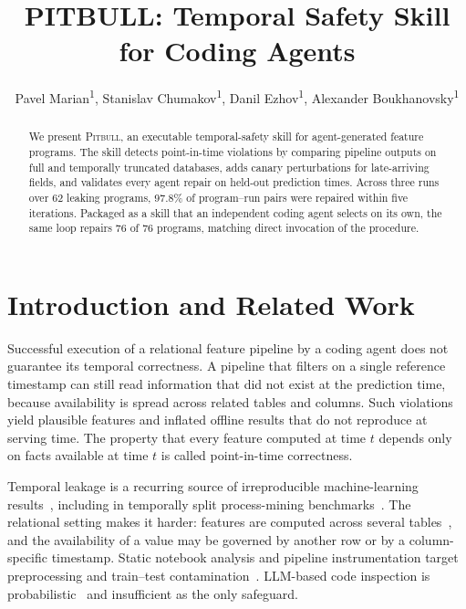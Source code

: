 \documentclass[letterpaper]{article} %
\title{PITBULL: Temporal Safety Skill for Coding Agents}
\author{
    Pavel Marian\textsuperscript{\rm 1},
    Stanislav Chumakov\textsuperscript{\rm 1},
    Danil Ezhov\textsuperscript{\rm 1},
    Alexander Boukhanovsky\textsuperscript{\rm 1}
}
\begin{document}
\maketitle

\begin{abstract}
We present \textsc{Pitbull}, an executable temporal-safety skill for
agent-generated feature programs. The skill detects point-in-time violations
by comparing pipeline outputs on full and temporally truncated databases,
adds canary perturbations for late-arriving fields, and validates every
agent repair on held-out prediction times. Across three runs over 62 leaking
programs, 97.8\% of program--run pairs were repaired within five iterations.
Packaged as a skill that an independent coding agent selects on its own, the
same loop repairs 76 of 76 programs, matching direct invocation of the
procedure.
\end{abstract}

\begin{links}
\end{links}

\section{Introduction and Related Work}

Successful execution of a relational feature pipeline by a coding agent
does not guarantee its temporal correctness. A pipeline that filters on a
single reference timestamp can still read information that did not exist at
the prediction time, because availability is spread across related tables
and columns. Such violations yield plausible features and inflated offline
results that do not reproduce at serving time. The property that every
feature computed at time $t$ depends only on facts available at time $t$ is
called point-in-time correctness.

Temporal leakage is a recurring source of irreproducible machine-learning
results~\cite{10.1145/2382577.2382579,kapoor2022leakagereproducibilitycrisismlbased},
including in temporally split process-mining
benchmarks~\cite{DBLP:journals/corr/abs-2107-01905}. The relational setting
makes it harder: features are computed across several
tables~\cite{robinson2024relbenchbenchmarkdeeplearning}, and the availability
of a value may be governed by another row or by a column-specific timestamp.
Static notebook analysis and pipeline instrumentation target preprocessing
and train--test
contamination~\cite{yang2022dataleakagenotebooksstatic,10.1145/3448016.3452759}.
LLM-based code inspection is probabilistic~\cite{alturayeif2025data} and
insufficient as the only safeguard.
\end{document}
